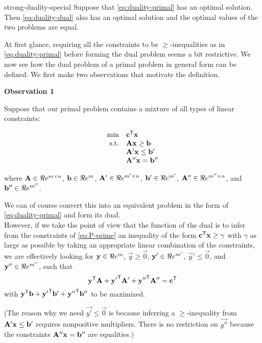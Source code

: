 \begin{theorem}{strong-duality-special}{}
\protect\hypertarget{thm:strong-duality-special}{}{\label{thm:strong-duality-special}}
Suppose that \eqref{eq:duality-primal} has an optimal solution. Then
\eqref{eq:duality-dual} also has an optimal solution and the optimal
values of the two problems are equal.
\end{theorem}

At first glance, requiring all the constraints to be
\(\geq\)-inequalities as in \eqref{eq:duality-primal} before forming the
dual problem seems a bit restrictive. We now see how the dual problem of
a primal problem in general form can be defined. We first make two
observations that motivate the definition.

\textbf{Observation 1}

Suppose that our primal problem contains a mixture of all types of
linear constraints:

\begin{equation}
\begin{array}{rl}
\min & \mathbf{c}^{\mathsf{T}}\mathbf{x}  \\
\mbox{s.t.} & \mathbf{A}\mathbf{x}\geq \mathbf{b} \\
& \mathbf{A'}\mathbf{x} \leq \mathbf{b'} \\
& \mathbf{A''}\mathbf{x} = \mathbf{b''}
\end{array} \label{eq:P-prime}
\end{equation}

where \(\mathbf{A} \in \Re e^{m\times n}\), \(\mathbf{b} \in \Re e^{m}\),
\(\mathbf{A}' \in \Re e^{m'\times n}\), \(\mathbf{b}' \in \Re e^{m'}\),
\(\mathbf{A}'' \in \Re e^{m''\times n}\), and \(\mathbf{b}'' \in \Re e^{m''}\).

We can of course convert this into an equivalent problem in the form of
\eqref{eq:duality-primal} and form its dual.\\
However, if we take the point of view that the function of the dual is
to infer from the constraints of \eqref{eq:P-prime} an inequality of the
form \(\mathbf{c}^{\mathsf{T}} \mathbf{x} \geq \gamma\) with \(\gamma\) as large as
possible by taking an appropriate linear combination of the constraints,
we are effectively looking for \(\mathbf{y} \in \Re e^{m}\),
\(\vec{y} \geq \vec{0}\), \(\mathbf{y}' \in \Re e^{m'}\),
\(\vec{y}' \leq \vec{0}\), and \(\mathbf{y}'' \in \Re e^{m''}\), such that
\[\mathbf{y}^{\mathsf{T}}\mathbf{A}
+\mathbf{y'}^{\mathsf{T}}\mathbf{A'}
+\mathbf{y''}^{\mathsf{T}}\mathbf{A''} = \mathbf{c}^{\mathsf{T}}\] with
\(\mathbf{y}^{\mathsf{T}}\mathbf{b} +\mathbf{y'}^{\mathsf{T}}\mathbf{b'} +\mathbf{y''}^{\mathsf{T}}\mathbf{b''}\) to be
maximized.

(The reason why we need \(\vec{y'} \leq \vec{0}\) is because inferring a
\(\geq\)-inequality from \(\mathbf{A}'\mathbf{x} \leq \mathbf{b}'\) requires
nonpositive multipliers. There is no restriction on \(\vec{y''}\)
because the constraints \(\mathbf{A}''\mathbf{x} = \mathbf{b}''\) are equalities.)

